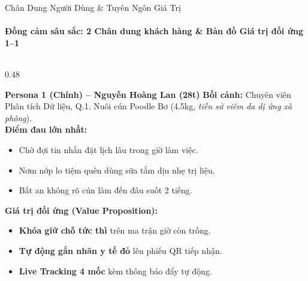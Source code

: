 \begin{frame}{Chân Dung Người Dùng \& Tuyên Ngôn Giá Trị}
  \framesubtitle{\color{PetcareSecondary}\textbf{Đồng cảm sâu sắc: 2 Chân dung khách hàng \& Bản đồ Giá trị đối ứng 1--1}}

  \begin{columns}[T]
    \begin{column}{0.48\textwidth}
      \begin{block}{\footnotesize \textbf{Persona 1 (Chính) -- Nguyễn Hoàng Lan (28t)}}
        \scriptsize
        \textbf{Bối cảnh:} Chuyên viên Phân tích Dữ liệu, Q.1. Nuôi cún Poodle Bơ (4.5kg, \textit{tiền sử viêm da dị ứng xà phòng}).\\[1mm]
        \textbf{Điểm đau lớn nhất:}
        \begin{itemize}
          \tiny
          \item Chờ đợi tin nhắn đặt lịch lâu trong giờ làm việc.
          \item Nơm nớp lo tiệm quên dùng sữa tắm dịu nhẹ trị liệu.
          \item Bất an không rõ cún làm đến đâu suốt 2 tiếng.
        \end{itemize}
        \textbf{Giá trị đối ứng (Value Proposition):}
        \begin{itemize}
          \tiny
          \item \textbf{Khóa giữ chỗ tức thì} trên ma trận giờ còn trống.
          \item \textbf{Tự động gắn nhãn y tế đỏ} lên phiếu QR tiếp nhận.
          \item \textbf{Live Tracking 4 mốc} kèm thông báo đẩy tự động.
        \end{itemize}
      \end{block}
    \end{column}


\end{columns}
\end{frame}
